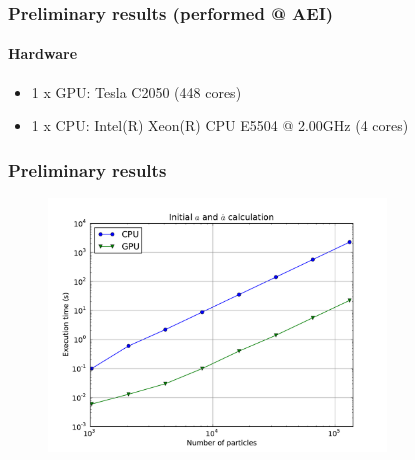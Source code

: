 \begin{frame}
    \frametitle{Preliminary results (performed @ AEI)}
    \framesubtitle{Hardware}
    \begin{itemize}
        \item 1 x GPU: Tesla C2050 (448 cores)
        \item 1 x CPU: Intel(R) Xeon(R) CPU E5504  @ 2.00GHz (4 cores)

    \end{itemize}
\end{frame}

\begin{frame}
    \frametitle{Preliminary results}
    \begin{figure}
        \centering
        \label{fig:init-time}
        \includegraphics[width=0.8\textwidth]{img/plot-init}
    \end{figure}
\end{frame}


